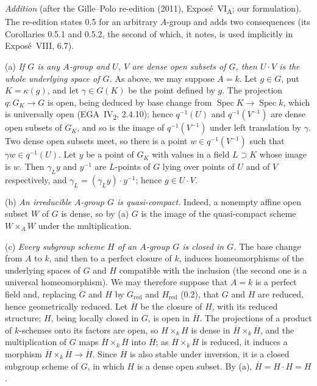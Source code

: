 \medskip\noindent
\emph{Addition} (after the Gille--Polo re-edition (2011), Exposé~VI\textsubscript{A}; our
formulation). The re-edition states 0.5 for an arbitrary \(A\)-group and adds two consequences
(its Corollaries 0.5.1 and 0.5.2, the second of which, it notes, is used implicitly in Exposé~VIII,
6.7).

(a) \emph{If \(G\) is any \(A\)-group and \(U\), \(V\) are dense open subsets of \(G\), then
\(U\cdot V\) is the whole underlying space of \(G\).} As above, we may suppose \(A=k\). Let
\(g\in G\), put \(K=\kappa(g)\), and let \(\gamma\in G(K)\) be the point defined by \(g\). The
projection \(q:G_K\to G\) is open, being deduced by base change from
\(\operatorname{Spec}K\to\operatorname{Spec}k\), which is universally open
(EGA~IV\textsubscript{2}, 2.4.10); hence \(q^{-1}(U)\) and \(q^{-1}(V^{-1})\) are dense open subsets
of \(G_K\), and so is the image of \(q^{-1}(V^{-1})\) under left translation by \(\gamma\). Two
dense open subsets meet, so there is a point \(w\in q^{-1}(V^{-1})\) such that
\(\gamma w\in q^{-1}(U)\). Let \(y\) be a point of \(G_K\) with values in a field \(L\supset K\)
whose image is \(w\). Then \(\gamma_Ly\) and \(y^{-1}\) are \(L\)-points of \(G\) lying over points
of \(U\) and of \(V\) respectively, and \(\gamma_L=(\gamma_Ly)\cdot y^{-1}\); hence
\(g\in U\cdot V\).

\label{sga3:VIA:0.5.1}%
(b) \emph{An irreducible \(A\)-group \(G\) is quasi-compact.} Indeed, a nonempty affine open
subset \(W\) of \(G\) is dense, so by (a) \(G\) is the image of the quasi-compact scheme
\(W\times_AW\) under the multiplication.

\label{sga3:VIA:0.5.2}%
(c) \emph{Every subgroup scheme \(H\) of an \(A\)-group \(G\) is closed in \(G\).} The base change
from \(A\) to \(k\), and then to a perfect closure of \(k\), induces homeomorphisms of the underlying
spaces of \(G\) and \(H\) compatible with the inclusion (the second one is a universal
homeomorphism). We may therefore suppose that \(A=k\) is a perfect field and,
replacing \(G\) and \(H\) by \(G_{\mathrm{red}}\) and \(H_{\mathrm{red}}\) (0.2), that \(G\) and \(H\)
are reduced, hence geometrically reduced. Let \(\overline H\) be the closure of \(H\), with its
reduced structure; \(H\), being locally closed in \(G\), is open in \(\overline H\). The projections
of a product of \(k\)-schemes onto its factors are open, so \(H\times_kH\) is dense in
\(\overline H\times_k\overline H\), and the multiplication of \(G\) maps
\(\overline H\times_k\overline H\) into \(\overline H\); as \(\overline H\times_k\overline H\) is
reduced, it induces a morphism \(\overline H\times_k\overline H\to\overline H\). Since \(\overline H\)
is also stable under inversion, it is a closed subgroup scheme of \(G\), in which \(H\) is a dense
open subset. By (a), \(\overline H=H\cdot H=H\).

